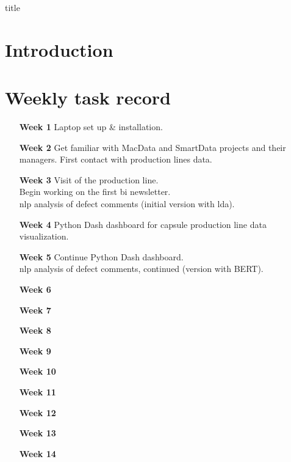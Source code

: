 \documentclass[12pt]{book}
\begin{document}
{title}

\tableofcontents


\chapter{Introduction}


\appendix
\chapter{Weekly task record}
\begin{itemize}
      \item [\textbf{Week 1}] Laptop set up \& installation.
      \item [\textbf{Week 2}]
            Get familiar with MacData and SmartData projects and their managers.
            First contact with production lines data.
      \item [\textbf{Week 3}]
            Visit of the production line. \\
            Begin working on the first \gls{bi} newsletter. \\
            \gls{nlp} analysis of defect comments (initial version with \gls{lda}).
            \item [\textbf{Week 4}]
            Python Dash dashboard for capsule production line data visualization.
            \item [\textbf{Week 5}]
            Continue Python Dash dashboard. \\
            \gls{nlp} analysis of defect comments, continued (version with BERT).
      \item [\textbf{Week 6}]
      \item [\textbf{Week 7}]
      \item [\textbf{Week 8}]
      \item [\textbf{Week 9}]
      \item [\textbf{Week 10}]
      \item [\textbf{Week 11}]
      \item [\textbf{Week 12}]
      \item [\textbf{Week 13}]
      \item [\textbf{Week 14}]
\end{itemize}


\end{document}
